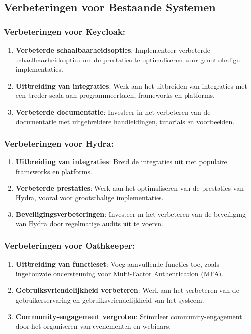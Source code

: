 \subsection{Verbeteringen voor Bestaande Systemen}%
\label{subsec:verbeteringen-voor-bestaande-systemen}
\subsubsection{Verbeteringen voor Keycloak:}%
\label{subsubsec:verbeteringen-voor-keycloak}
\begin{enumerate}[label=\arabic*.]
    \item \textbf{Verbeterde schaalbaarheidsopties}: Implementeer verbeterde schaalbaarheidsopties om de prestaties te optimaliseren voor grootschalige implementaties.
    \item \textbf{Uitbreiding van integraties}: Werk aan het uitbreiden van integraties met een breder scala aan programmeertalen, frameworks en platforms.
    \item \textbf{Verbeterde documentatie}: Investeer in het verbeteren van de documentatie met uitgebreidere handleidingen, tutorials en voorbeelden.
\end{enumerate}

\subsubsection{Verbeteringen voor Hydra:}%
\label{subsubsec:verbeteringen-voor-hydra}
\begin{enumerate}[label=\arabic*.]
    \item \textbf{Uitbreiding van integraties}: Breid de integraties uit met populaire frameworks en platforms.
    \item \textbf{Verbeterde prestaties}: Werk aan het optimaliseren van de prestaties van Hydra, vooral voor grootschalige implementaties.
    \item \textbf{Beveiligingsverbeteringen}: Investeer in het verbeteren van de beveiliging van Hydra door regelmatige audits uit te voeren.
\end{enumerate}

\subsubsection{Verbeteringen voor Oathkeeper:}%
\label{subsubsec:verbeteringen-voor-oathkeeper}
\begin{enumerate}[label=\arabic*.]
    \item \textbf{Uitbreiding van functieset}: Voeg aanvullende functies toe, zoals ingebouwde ondersteuning voor Multi-Factor Authentication (MFA).
    \item \textbf{Gebruiksvriendelijkheid verbeteren}: Werk aan het verbeteren van de gebruikerservaring en gebruiksvriendelijkheid van het systeem.
    \item \textbf{Community-engagement vergroten}: Stimuleer community-engagement door het organiseren van evenementen en webinars.
\end{enumerate}


